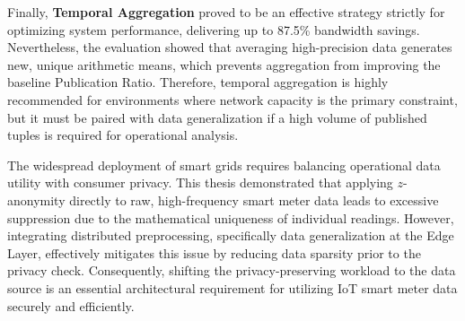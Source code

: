 Finally, \textbf{Temporal Aggregation} proved to be an effective strategy strictly for optimizing system performance, delivering up to 87.5\% bandwidth savings. Nevertheless, the evaluation showed that averaging high-precision data generates new, unique arithmetic means, which prevents aggregation from improving the baseline Publication Ratio. Therefore, temporal aggregation is highly recommended for environments where network capacity is the primary constraint, but it must be paired with data generalization if a high volume of published tuples is required for operational analysis.

The widespread deployment of smart grids requires balancing operational data utility with consumer privacy. This thesis demonstrated that applying $z$-anonymity directly to raw, high-frequency smart meter data leads to excessive suppression due to the mathematical uniqueness of individual readings. However, integrating distributed preprocessing, specifically data generalization at the Edge Layer, effectively mitigates this issue by reducing data sparsity prior to the privacy check. Consequently, shifting the privacy-preserving workload to the data source is an essential architectural requirement for utilizing \ac{IoT} smart meter data securely and efficiently.

\newpage